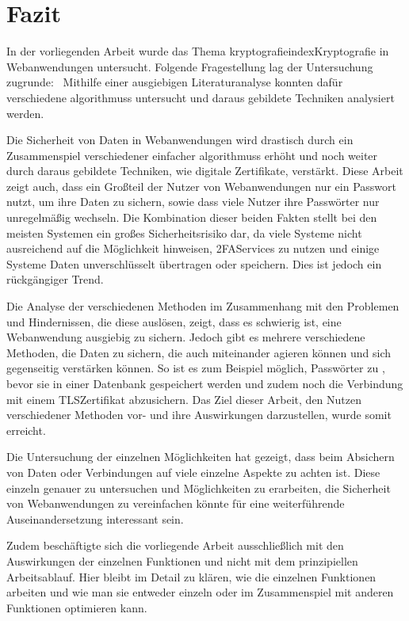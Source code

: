 \newpage
\section{Fazit}\label{sec:fazit}

In der vorliegenden Arbeit wurde das Thema \Gls{kryptografie}index{Kryptografie} in Webanwendungen untersucht.
Folgende Fragestellung lag der Untersuchung zugrunde: \myForschungsfrage\
Mithilfe einer ausgiebigen Literaturanalyse konnten dafür verschiedene  \glspl{algorithmus} untersucht und daraus gebildete Techniken analysiert werden.

Die Sicherheit von Daten in Webanwendungen wird drastisch durch ein Zusammenspiel verschiedener einfacher \glspl{algorithmus} erhöht und noch weiter durch daraus gebildete Techniken, wie \zb digitale Zertifikate, verstärkt.
Diese Arbeit zeigt auch, dass ein Großteil der Nutzer von Webanwendungen nur ein Passwort nutzt, um ihre Daten zu sichern, sowie dass viele Nutzer ihre Passwörter nur unregelmäßig wechseln.
Die Kombination dieser beiden Fakten stellt bei den meisten Systemen ein großes Sicherheitsrisiko dar, da viele Systeme \zb nicht ausreichend auf die Möglichkeit hinweisen, \ac{2FA}\nonbreakdash Services zu nutzen und einige Systeme Daten unverschlüsselt übertragen oder speichern.
Dies ist jedoch ein rückgängiger Trend.

Die Analyse der verschiedenen  Methoden im Zusammenhang mit den Problemen und Hindernissen, die diese auslösen, zeigt, dass es schwierig ist, eine Webanwendung ausgiebig zu sichern.
Jedoch gibt es mehrere verschiedene Methoden, die Daten zu sichern, die auch miteinander agieren können und sich gegenseitig verstärken können.
So ist es zum Beispiel möglich, Passwörter zu \glsdisp{hashfunc}{hashen}, bevor sie in einer Datenbank gespeichert werden und zudem noch die Verbindung mit einem \ac{TLS}\nonbreakdash Zertifikat abzusichern.
Das Ziel dieser Arbeit, den Nutzen verschiedener \glsdisp{kryptografie}{kryptografischer} Methoden vor- und ihre Auswirkungen darzustellen, wurde somit erreicht.

Die Untersuchung der einzelnen Möglichkeiten hat gezeigt, dass beim Absichern von Daten oder Verbindungen auf viele einzelne Aspekte zu achten ist.
Diese einzeln genauer zu untersuchen und Möglichkeiten zu erarbeiten, die Sicherheit von Webanwendungen zu vereinfachen könnte für eine weiterführende Auseinandersetzung interessant sein.

Zudem beschäftigte sich die vorliegende Arbeit ausschließlich mit den Auswirkungen der einzelnen Funktionen und nicht mit dem prinzipiellen Arbeitsablauf.
Hier bleibt im Detail zu klären, wie die einzelnen Funktionen arbeiten und wie man sie entweder einzeln oder im Zusammenspiel mit anderen Funktionen optimieren kann.